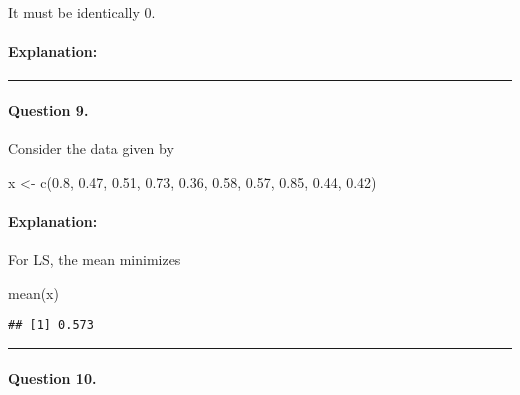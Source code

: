 \documentclass[
]{article}
\newenvironment{Shaded}{\begin{snugshade}}{\end{snugshade}}
\newcommand{\FloatTok}[1]{\textcolor[rgb]{0.00,0.00,0.81}{#1}}
\newcommand{\FunctionTok}[1]{\textcolor[rgb]{0.00,0.00,0.00}{#1}}
\newcommand{\NormalTok}[1]{#1}
\newcommand{\OtherTok}[1]{\textcolor[rgb]{0.56,0.35,0.01}{#1}}
\begin{document}
It must be identically 0.

\hypertarget{explanation-7}{%
\paragraph{Explanation:}\label{explanation-7}}

\begin{center}\rule{0.5\linewidth}{0.5pt}\end{center}

\hypertarget{question-9.}{%
\paragraph{Question 9.}\label{question-9.}}

Consider the data given by

\begin{Shaded}
\begin{Highlighting}[]
\NormalTok{x }\OtherTok{\textless{}{-}} \FunctionTok{c}\NormalTok{(}\FloatTok{0.8}\NormalTok{, }\FloatTok{0.47}\NormalTok{, }\FloatTok{0.51}\NormalTok{, }\FloatTok{0.73}\NormalTok{, }\FloatTok{0.36}\NormalTok{, }\FloatTok{0.58}\NormalTok{, }\FloatTok{0.57}\NormalTok{, }\FloatTok{0.85}\NormalTok{, }\FloatTok{0.44}\NormalTok{, }\FloatTok{0.42}\NormalTok{)}
\end{Highlighting}
\end{Shaded}

\hypertarget{explanation-8}{%
\paragraph{Explanation:}\label{explanation-8}}

For LS, the mean minimizes

\begin{Shaded}
\begin{Highlighting}[]
\FunctionTok{mean}\NormalTok{(x)}
\end{Highlighting}
\end{Shaded}

\begin{verbatim}
## [1] 0.573
\end{verbatim}

\begin{center}\rule{0.5\linewidth}{0.5pt}\end{center}

\hypertarget{question-10.}{%
\paragraph{Question 10.}\label{question-10.}}
\end{document}
